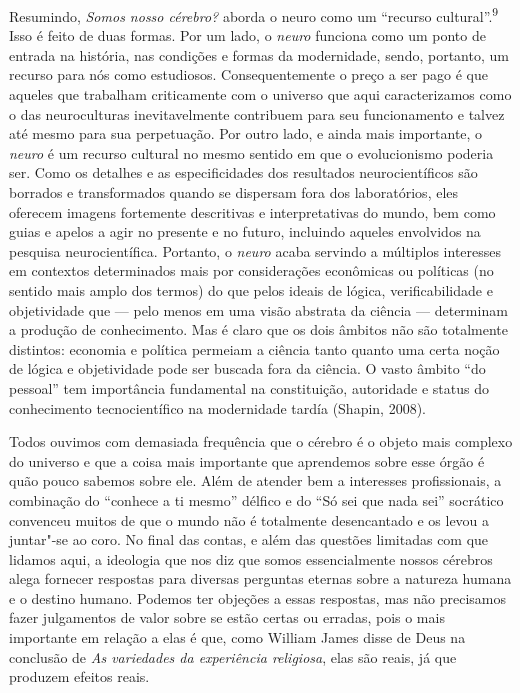 Resumindo, \emph{Somos nosso cérebro?} aborda o neuro como um ``recurso
cultural''.\textsuperscript{9} Isso é feito de duas formas. Por um lado,
o \emph{neuro} funciona como um ponto de entrada na história, nas
condições e formas da modernidade, sendo, portanto, um recurso para nós
como estudiosos. Consequentemente o preço a ser pago é que aqueles que
trabalham criticamente com o universo que aqui caracterizamos como o das
neuroculturas inevitavelmente contribuem para seu funcionamento e talvez
até mesmo para sua perpetuação. Por outro lado, e ainda mais importante,
o \emph{neuro} é um recurso cultural no mesmo sentido em que o
evolucionismo poderia ser. Como os detalhes e as especificidades dos
resultados neurocientíficos são borrados e transformados quando se
dispersam fora dos laboratórios, eles oferecem imagens fortemente
descritivas e interpretativas do mundo, bem como guias e apelos a agir
no presente e no futuro, incluindo aqueles envolvidos na pesquisa
neurocientífica. Portanto, o \emph{neuro} acaba servindo a múltiplos
interesses em contextos determinados mais por considerações econômicas
ou políticas (no sentido mais amplo dos termos) do que pelos ideais de
lógica, verificabilidade e objetividade que --- pelo menos em uma visão
abstrata da ciência --- determinam a produção de conhecimento. Mas é
claro que os dois âmbitos não são totalmente distintos: economia e
política permeiam a ciência tanto quanto uma certa noção de lógica e
objetividade pode ser buscada fora da ciência. O vasto âmbito ``do
pessoal'' tem importância fundamental na constituição, autoridade e
status do conhecimento tecnocientífico na modernidade tardía (Shapin,
2008).

Todos ouvimos com demasiada frequência que o cérebro é o objeto mais
complexo do universo e que a coisa mais importante que aprendemos sobre
esse órgão é quão pouco sabemos sobre ele. Além de atender bem a
interesses profissionais, a combinação do ``conhece a ti mesmo'' délfico
e do ``Só sei que nada sei'' socrático convenceu muitos de que o mundo
não é totalmente desencantado e os levou a juntar"-se ao coro. No final
das contas, e além das questões limitadas com que lidamos aqui, a
ideologia que nos diz que somos essencialmente nossos cérebros alega
fornecer respostas para diversas perguntas eternas sobre a natureza
humana e o destino humano. Podemos ter objeções a essas respostas, mas
não precisamos fazer julgamentos de valor sobre se estão certas ou
erradas, pois o mais importante em relação a elas é que, como William
James disse de Deus na conclusão de \emph{As variedades da experiência
religiosa}, elas são reais, já que produzem efeitos reais.

